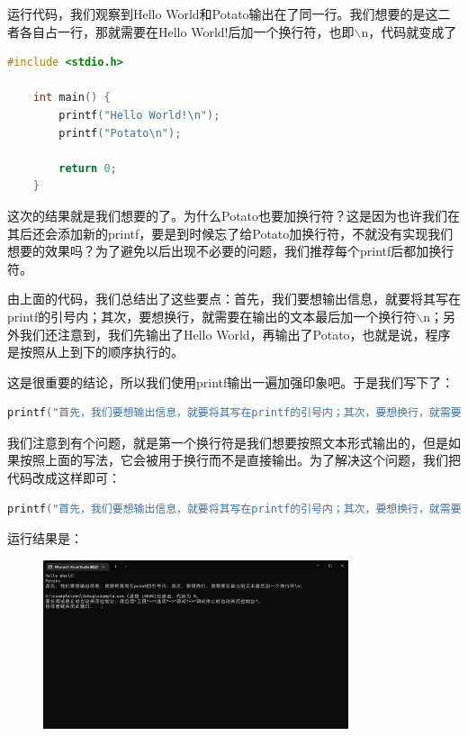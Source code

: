 运行代码，我们观察到Hello World和Potato输出在了同一行。我们想要的是这二者各自占一行，那就需要在Hello World!后加一个换行符，也即$\backslash$n，代码就变成了

\begin{lstlisting}[language=C]
    #include <stdio.h>
    
    int main() {
        printf("Hello World!\n");
        printf("Potato\n");

        return 0;
    }
\end{lstlisting}

这次的结果就是我们想要的了。为什么Potato也要加换行符？这是因为也许我们在其后还会添加新的printf，要是到时候忘了给Potato加换行符，不就没有实现我们想要的效果吗？为了避免以后出现不必要的问题，我们推荐每个printf后都加换行符。

由上面的代码，我们总结出了这些要点：首先，我们要想输出信息，就要将其写在printf的引号内；其次，要想换行，就需要在输出的文本最后加一个换行符$\backslash$n；另外我们还注意到，我们先输出了Hello World，再输出了Potato，也就是说，程序是按照从上到下的顺序执行的。

这是很重要的结论，所以我们使用printf输出一遍加强印象吧。于是我们写下了：

\begin{lstlisting}[language=C]
    printf("首先，我们要想输出信息，就要将其写在printf的引号内；其次，要想换行，就需要在输出的文本最后加一个换行符\n；\n");
\end{lstlisting}

我们注意到有个问题，就是第一个换行符是我们想要按照文本形式输出的，但是如果按照上面的写法，它会被用于换行而不是直接输出。为了解决这个问题，我们把代码改成这样即可：

\begin{lstlisting}[language=C]
    printf("首先，我们要想输出信息，就要将其写在printf的引号内；其次，要想换行，就需要在输出的文本最后加一个换行符\\n；\n");
\end{lstlisting}

运行结果是：

\begin{figure}[ht]
    \centering
    \includegraphics[width=0.8\textwidth, height=0.4\textheight]{images/1换行符输出.png}
\end{figure}

